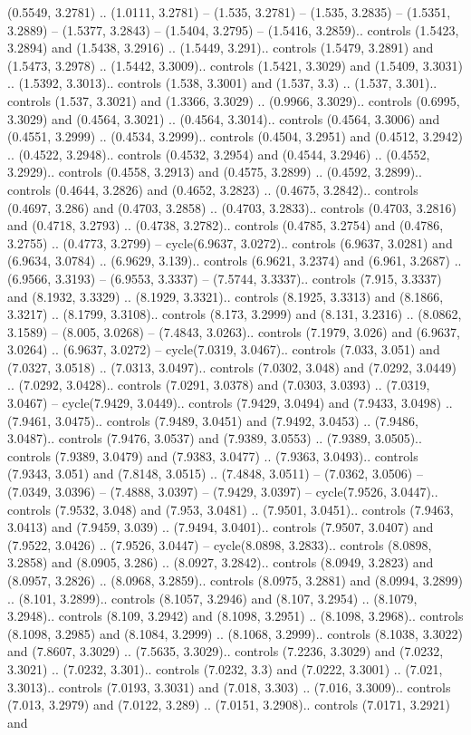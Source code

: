 (0.5549, 3.2781) .. (1.0111, 3.2781) -- (1.535, 3.2781) -- (1.535, 3.2835) -- (1.5351, 3.2889) -- (1.5377, 3.2843) -- (1.5404, 3.2795) -- (1.5416, 3.2859).. controls (1.5423, 3.2894) and (1.5438, 3.2916) .. (1.5449, 3.291).. controls (1.5479, 3.2891) and (1.5473, 3.2978) .. (1.5442, 3.3009).. controls (1.5421, 3.3029) and (1.5409, 3.3031) .. (1.5392, 3.3013).. controls (1.538, 3.3001) and (1.537, 3.3) .. (1.537, 3.301).. controls (1.537, 3.3021) and (1.3366, 3.3029) .. (0.9966, 3.3029).. controls (0.6995, 3.3029) and (0.4564, 3.3021) .. (0.4564, 3.3014).. controls (0.4564, 3.3006) and (0.4551, 3.2999) .. (0.4534, 3.2999).. controls (0.4504, 3.2951) and (0.4512, 3.2942) .. (0.4522, 3.2948).. controls (0.4532, 3.2954) and (0.4544, 3.2946) .. (0.4552, 3.2929).. controls (0.4558, 3.2913) and (0.4575, 3.2899) .. (0.4592, 3.2899).. controls (0.4644, 3.2826) and (0.4652, 3.2823) .. (0.4675, 3.2842).. controls (0.4697, 3.286) and (0.4703, 3.2858) .. (0.4703, 3.2833).. controls (0.4703, 3.2816) and (0.4718, 3.2793) .. (0.4738, 3.2782).. controls (0.4785, 3.2754) and (0.4786, 3.2755) .. (0.4773, 3.2799) -- cycle(6.9637, 3.0272).. controls (6.9637, 3.0281) and (6.9634, 3.0784) .. (6.9629, 3.139).. controls (6.9621, 3.2374) and (6.961, 3.2687) .. (6.9566, 3.3193) -- (6.9553, 3.3337) -- (7.5744, 3.3337).. controls (7.915, 3.3337) and (8.1932, 3.3329) .. (8.1929, 3.3321).. controls (8.1925, 3.3313) and (8.1866, 3.3217) .. (8.1799, 3.3108).. controls (8.173, 3.2999) and (8.131, 3.2316) .. (8.0862, 3.1589) -- (8.005, 3.0268) -- (7.4843, 3.0263).. controls (7.1979, 3.026) and (6.9637, 3.0264) .. (6.9637, 3.0272) -- cycle(7.0319, 3.0467).. controls (7.033, 3.051) and (7.0327, 3.0518) .. (7.0313, 3.0497).. controls (7.0302, 3.048) and (7.0292, 3.0449) .. (7.0292, 3.0428).. controls (7.0291, 3.0378) and (7.0303, 3.0393) .. (7.0319, 3.0467) -- cycle(7.9429, 3.0449).. controls (7.9429, 3.0494) and (7.9433, 3.0498) .. (7.9461, 3.0475).. controls (7.9489, 3.0451) and (7.9492, 3.0453) .. (7.9486, 3.0487).. controls (7.9476, 3.0537) and (7.9389, 3.0553) .. (7.9389, 3.0505).. controls (7.9389, 3.0479) and (7.9383, 3.0477) .. (7.9363, 3.0493).. controls (7.9343, 3.051) and (7.8148, 3.0515) .. (7.4848, 3.0511) -- (7.0362, 3.0506) -- (7.0349, 3.0396) -- (7.4888, 3.0397) -- (7.9429, 3.0397) -- cycle(7.9526, 3.0447).. controls (7.9532, 3.048) and (7.953, 3.0481) .. (7.9501, 3.0451).. controls (7.9463, 3.0413) and (7.9459, 3.039) .. (7.9494, 3.0401).. controls (7.9507, 3.0407) and (7.9522, 3.0426) .. (7.9526, 3.0447) -- cycle(8.0898, 3.2833).. controls (8.0898, 3.2858) and (8.0905, 3.286) .. (8.0927, 3.2842).. controls (8.0949, 3.2823) and (8.0957, 3.2826) .. (8.0968, 3.2859).. controls (8.0975, 3.2881) and (8.0994, 3.2899) .. (8.101, 3.2899).. controls (8.1057, 3.2946) and (8.107, 3.2954) .. (8.1079, 3.2948).. controls (8.109, 3.2942) and (8.1098, 3.2951) .. (8.1098, 3.2968).. controls (8.1098, 3.2985) and (8.1084, 3.2999) .. (8.1068, 3.2999).. controls (8.1038, 3.3022) and (7.8607, 3.3029) .. (7.5635, 3.3029).. controls (7.2236, 3.3029) and (7.0232, 3.3021) .. (7.0232, 3.301).. controls (7.0232, 3.3) and (7.0222, 3.3001) .. (7.021, 3.3013).. controls (7.0193, 3.3031) and (7.018, 3.303) .. (7.016, 3.3009).. controls (7.013, 3.2979) and (7.0122, 3.289) .. (7.0151, 3.2908).. controls (7.0171, 3.2921) and 